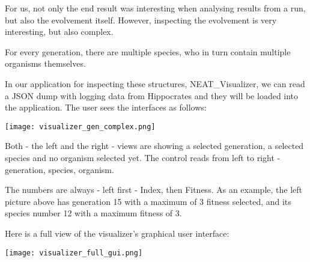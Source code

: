 For us, not only the end result was interesting when analysing results from a run, but also the evolvement itself. However, inspecting the evolvement is very interesting, but also complex.

For every generation, there are multiple species, who in turn contain multiple organisms themselves.\cite{Stanley2002}

In our application for inspecting these structures, NEAT\_Visualizer, we can read a JSON dump with logging data from Hippocrates and they will be loaded into the application. The user sees the interfaces as follows:

\texttt{[image: visualizer\_gen\_complex.png]}

Both - the left and the right - views are showing a selected generation, a selected species and no organism selected yet. The control reads from left to right - generation, species, organism.

The numbers are always - left first - Index, then Fitness. As an example, the left picture above has generation 15 with a maximum of 3 fitness selected, and its species number 12 with a maximum fitness of 3.

Here is a full view of the visualizer's graphical user interface:

\texttt{[image: visualizer\_full\_gui.png]}